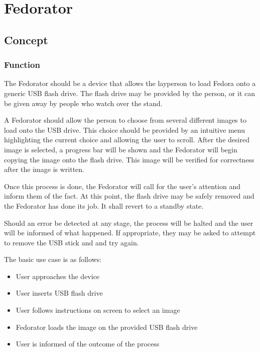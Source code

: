 \chapter{Fedorator}
    \section{Concept}
        \subsection{Function}
            
            The Fedorator should be a device that allows the layperson to load Fedora onto a generic USB flash drive.  The flash drive may be provided by the person, or it can be given away by people who watch over the stand.
            
            A Fedorator should allow the person to choose from several different images to load onto the USB drive.  This choice should be provided by an intuitive menu highlighting the current choice and allowing the user to scroll.  After the desired image is selected, a progress bar will be shown and the Fedorator will begin copying the image onto the flash drive.  This image will be verified for correctness after the image is written.
            
            Once this process is done, the Fedorator will call for the user's attention and inform them of the fact.  At this point, the flash drive may be safely removed and the Fedorator has done its job.  It shall revert to a standby state.
            
            Should an error be detected at any stage, the process will be halted and the user will be informed of what happened.  If appropriate, they may be asked to attempt to remove the USB stick and  and try again.
            
            The basic use case is as follows:
            
            \begin{itemize}
                \item User approaches the device
                \item User inserts USB flash drive
                \item User follows instructions on screen to select an image
                \item Fedorator loads the image on the provided USB flash drive
                \item User is informed of the outcome of the process
            \end{itemize}
